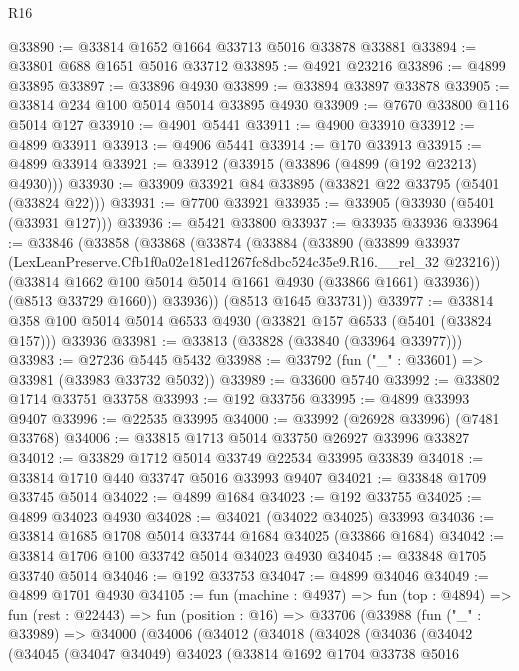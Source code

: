 \begin{lexlean}{R16}
\begin{coremodule}
@33890 := @33814 @1652 @1664 @33713 @5016 @33878 @33881
@33894 := @33801 @688 @1651 @5016 @33712
@33895 := @4921 @23216
@33896 := @4899 @33895
@33897 := @33896 @4930
@33899 := @33894 @33897 @33878
@33905 := @33814 @234 @100 @5014 @5014 @33895 @4930
@33909 := @7670 @33800 @116 @5014 @127
@33910 := @4901 @5441
@33911 := @4900 @33910
@33912 := @4899 @33911
@33913 := @4906 @5441
@33914 := @170 @33913
@33915 := @4899 @33914
@33921 := @33912 (@33915 (@33896 (@4899 (@192 @23213) @4930)))
@33930 := @33909 @33921 @84 @33895 (@33821 @22 @33795 (@5401 (@33824 @22)))
@33931 := @7700 @33921
@33935 := @33905 (@33930 (@5401 (@33931 @127)))
@33936 := @5421 @33800
@33937 := @33935 @33936
@33964 := @33846
    (@33858
      (@33868
        (@33874
          (@33884
            (@33890
              (@33899
                @33937
                (LexLeanPreserve.Cfb1f0a02e181ed1267fc8dbc524c35e9.R16.__rel_32 @23216))
              (@33814 @1662 @100 @5014 @5014 @1661 @4930 (@33866 @1661) @33936))
            (@8513 @33729 @1660))
          @33936))
      (@8513 @1645 @33731))
@33977 := @33814 @358 @100 @5014 @5014 @6533 @4930 (@33821 @157 @6533 (@5401 (@33824 @157))) @33936
@33981 := @33813 (@33828 (@33840 (@33964 @33977)))
@33983 := @27236 @5445 @5432
@33988 := @33792 (fun ("_" : @33601) => @33981 (@33983 @33732 @5032))
@33989 := @33600 @5740
@33992 := @33802 @1714 @33751 @33758
@33993 := @192 @33756
@33995 := @4899 @33993 @9407
@33996 := @22535 @33995
@34000 := @33992 (@26928 @33996) (@7481 @33768)
@34006 := @33815 @1713 @5014 @33750 @26927 @33996 @33827
@34012 := @33829 @1712 @5014 @33749 @22534 @33995 @33839
@34018 := @33814 @1710 @440 @33747 @5016 @33993 @9407
@34021 := @33848 @1709 @33745 @5014
@34022 := @4899 @1684
@34023 := @192 @33755
@34025 := @4899 @34023 @4930
@34028 := @34021 (@34022 @34025) @33993
@34036 := @33814 @1685 @1708 @5014 @33744 @1684 @34025 (@33866 @1684)
@34042 := @33814 @1706 @100 @33742 @5014 @34023 @4930
@34045 := @33848 @1705 @33740 @5014
@34046 := @192 @33753
@34047 := @4899 @34046
@34049 := @4899 @1701 @4930
@34105 := fun (machine : @4937) =>
  fun (top : @4894) =>
  fun (rest : @22443) =>
  fun (position : @16) =>
  @33706
    (@33988
      (fun ("_" : @33989) =>
      @34000
        (@34006
          (@34012
            (@34018
              (@34028
                (@34036
                  (@34042
                    (@34045
                      (@34047 @34049)
                      @34023
                      (@33814
                        @1692
                        @1704
                        @33738
                        @5016

\end{coremodule}
\end{lexlean}
